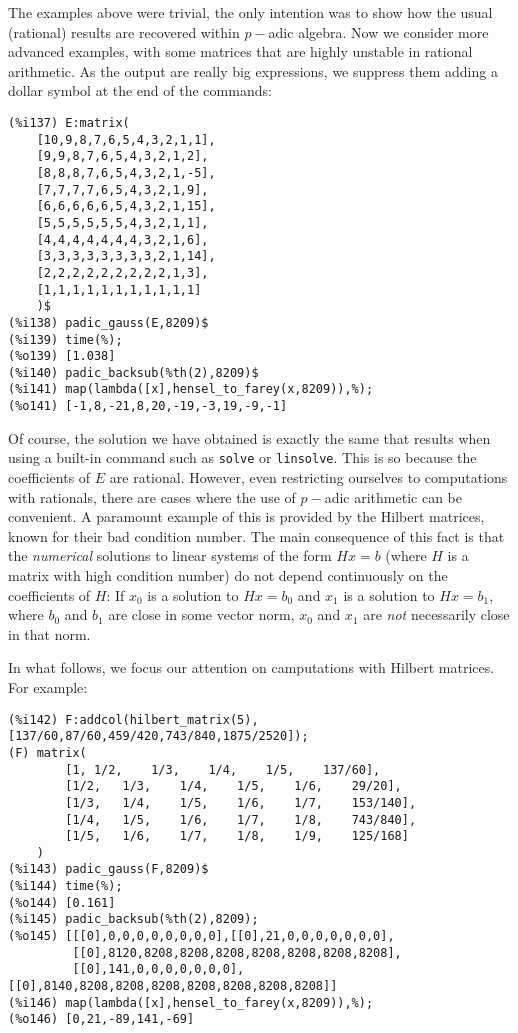 \documentclass[fleqn]{cas-sc}
\begin{document}
The examples above were trivial, the only intention was to show
	how the usual (rational) results are recovered within $p-$adic algebra.
	Now we consider more advanced examples, with some matrices that
	are highly unstable in rational arithmetic. As the output are really
	big expressions, we suppress them adding a dollar symbol at the end of the commands:
	
\begin{verbatim}
(%i137)	E:matrix(
	[10,9,8,7,6,5,4,3,2,1,1],
	[9,9,8,7,6,5,4,3,2,1,2],
	[8,8,8,7,6,5,4,3,2,1,-5],
	[7,7,7,7,6,5,4,3,2,1,9],
	[6,6,6,6,6,5,4,3,2,1,15],
	[5,5,5,5,5,5,4,3,2,1,1],
	[4,4,4,4,4,4,4,3,2,1,6],
	[3,3,3,3,3,3,3,3,2,1,14],
	[2,2,2,2,2,2,2,2,2,1,3],
	[1,1,1,1,1,1,1,1,1,1,1]
	)$
(%i138)	padic_gauss(E,8209)$
(%i139)	time(%);
(%o139)	[1.038]
(%i140)	padic_backsub(%th(2),8209)$
(%i141)	map(lambda([x],hensel_to_farey(x,8209)),%);
(%o141)	[-1,8,-21,8,20,-19,-3,19,-9,-1]
\end{verbatim}

Of course, the solution we have obtained is exactly the same that results
when using a built-in command such as \texttt{solve} or \texttt{linsolve}.
This is so because the coefficients of $E$ are rational. However, even 
restricting ourselves to computations with rationals, there are cases where
the use of $p-$adic arithmetic can be convenient. A paramount example of this
is provided by the Hilbert matrices, known for their bad condition number.
The main consequence of this fact is that the \emph{numerical} solutions to
linear systems of the form $Hx=b$ (where $H$ is a matrix with high condition
number) do not depend continuously on the coefficients of $H$: If $x_0$ is
a solution to $Hx=b_0$ and $x_1$ is a solution to $Hx=b_1$, where $b_0$ and $b_1$
are close in some vector norm, $x_0$ and $x_1$ are \emph{not} necessarily close in
that norm.

In what follows, we focus our attention on camputations with Hilbert matrices.
For example:

\begin{verbatim}
(%i142)	F:addcol(hilbert_matrix(5),[137/60,87/60,459/420,743/840,1875/2520]);
(F)	matrix(
		[1,	1/2,	1/3,	1/4,	1/5,	137/60],
		[1/2,	1/3,	1/4,	1/5,	1/6,	29/20],
		[1/3,	1/4,	1/5,	1/6,	1/7,	153/140],
		[1/4,	1/5,	1/6,	1/7,	1/8,	743/840],
		[1/5,	1/6,	1/7,	1/8,	1/9,	125/168]
	)
(%i143)	padic_gauss(F,8209)$
(%i144)	time(%);
(%o144)	[0.161]
(%i145)	padic_backsub(%th(2),8209);
(%o145)	[[[0],0,0,0,0,0,0,0,0],[[0],21,0,0,0,0,0,0,0],
         [[0],8120,8208,8208,8208,8208,8208,8208,8208],
         [[0],141,0,0,0,0,0,0,0],[[0],8140,8208,8208,8208,8208,8208,8208,8208]]
(%i146)	map(lambda([x],hensel_to_farey(x,8209)),%);
(%o146)	[0,21,-89,141,-69]
\end{verbatim}
\end{document}
